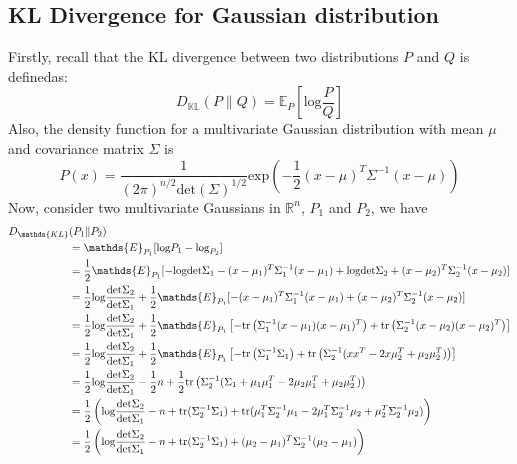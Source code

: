 \documentclass{article}
\begin{document}
	 \subsection{KL Divergence for Gaussian distribution}
	 Firstly, recall that the KL divergence between two distributions $P$ and $Q$ is definedas:
	 \begin{equation}
	 D_{\mathds{KL}}(P\|Q) = \mathds{E}_P\left[\text{log}\frac{P}{Q}\right]
	 \end{equation}
	 Also, the density function for a multivariate Gaussian distribution with mean $\mu$ and covariance matrix $\Sigma$ is
	 \begin{equation}
	 P(x) = \frac{1}{(2\pi)^{n/2}\text{det}(\Sigma)^{1/2}}\text{exp}\left(-\frac{1}{2}(x-\mu)^T\Sigma^{-1}(x-\mu)\right)
	 \end{equation}
	 Now, consider two multivariate Gaussians in $\mathds{R}^n$, $P_1$ and $P_2$, we have
	 \begin{align}
	 D_{\mathds{KL}}&(P_1\|P_2)\notag\\
	 &= \mathds{E}_{P_1}[\text{log}P_1-\text{log}_{P_2}]\notag\\
	 &= \frac{1}{2}\mathds{E}_{P_1}[-\text{logdet}\Sigma_1-(x-\mu_1)^T\Sigma_1^{-1}(x-\mu_1) + \text{logdet}\Sigma_2 + (x-\mu_2)^T\Sigma_2^{-1}(x-\mu_2)]\notag\\
	 &= \frac{1}{2}\text{log}\frac{\text{det}\Sigma_2}{\text{det}\Sigma_1} + \frac{1}{2}\mathds{E}_{P_1}[-(x-\mu_1)^T\Sigma_1^{-1}(x-\mu_1)+(x-\mu_2)^T\Sigma_2^{-1}(x-\mu_2)]\notag\\
	 & = \frac{1}{2}\text{log}\frac{\text{det}\Sigma_2}{\text{det}\Sigma_1} + \frac{1}{2}\mathds{E}_{P_1}\left[-\text{tr}\left(\Sigma_1^{-1}(x-\mu_1)(x-\mu_1)^T\right) + \text{tr}\left(\Sigma_2^{-1}(x-\mu_2)(x-\mu_2)^T\right)\right]\notag\\
	 & = \frac{1}{2}\text{log}\frac{\text{det}\Sigma_2}{\text{det}\Sigma_1} + \frac{1}{2}\mathds{E}_{P_1}\left[-\text{tr}\left(\Sigma_1^{-1}\Sigma_1\right) + \text{tr}\left(\Sigma_2^{-1}(xx^T-2x\mu_2^T+\mu_2\mu_2^T)\right)\right]\notag\\
	 & = \frac{1}{2}\text{log}\frac{\text{det}\Sigma_2}{\text{det}\Sigma_1} -\frac{1}{2}n+\frac{1}{2}\text{tr}\left(\Sigma_2^{-1}(\Sigma_1+\mu_1\mu_1^T-2\mu_2\mu_1^T+\mu_2\mu_2^T)\right)\notag\\
	 &=\frac{1}{2}\left(\text{log}\frac{\text{det}\Sigma_2}{\text{det}\Sigma_1} - n +\text{tr}(\Sigma_2^{-1}\Sigma_1)+\text{tr}(\mu_1^T\Sigma_2^{-1}\mu_1-2\mu_1^T\Sigma_2^{-1}\mu_2+\mu_2^T\Sigma_2^{-1}\mu_2)\right)\notag\\
	 &= \frac{1}{2}\left(\text{log}\frac{\text{det}\Sigma_2}{\text{det}\Sigma_1} - n +\text{tr}(\Sigma_2^{-1}\Sigma_1)+(\mu_2-\mu_1)^T\Sigma_2^{-1}(\mu_2-\mu_1)\right)\label{eq:14}
	 \end{align}
\end{document}
